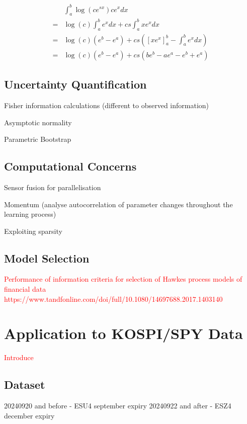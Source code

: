 \documentclass[honours,12pt]{unswthesis}
\numberwithin{equation}{section}
\begin{document}
\begin{equation*}
	\begin{align}
		& \int_a^b \log(c e^{sx}) c e^x dx \\
		= & \log(c) \int_a^b e^x dx + cs\int_a^b x e^x dx \\
		= & \log(c)(e^b-e^a) + cs \left(\left[x e^x\right]_a^b - \int_a^b e^x dx\right) \\
		= & \log(c)(e^b-e^a) + cs \left(be^b - a e^a - e^b + e^a\right)
	\end{align}
\end{equation*}


\section{Uncertainty Quantification}
Fisher information calculations (different to observed information)

Asymptotic normality

Parametric Bootstrap

\section{Computational Concerns}
Sensor fusion for parallelisation

Momentum (analyse autocorrelation of parameter changes throughout the learning process)

Exploiting sparsity \cite{NickelLe}

\section{Model Selection}

\textcolor{red}{Performance of information criteria for selection of Hawkes process models of financial data https://www.tandfonline.com/doi/full/10.1080/14697688.2017.1403140}


\chapter{Application to KOSPI/SPY Data} %

\textcolor{red}{Introduce}

\section{Dataset}

20240920 and before - ESU4 september expiry
20240922 and after - ESZ4 december expiry
\end{document}
